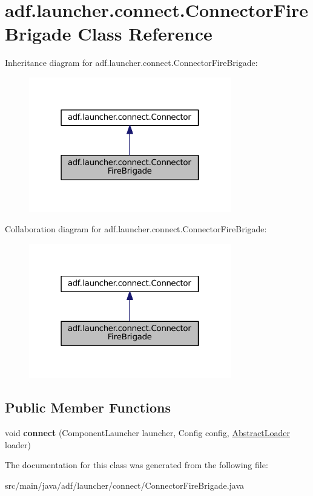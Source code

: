 \hypertarget{classadf_1_1launcher_1_1connect_1_1ConnectorFireBrigade}{}\section{adf.\+launcher.\+connect.\+Connector\+Fire\+Brigade Class Reference}
\label{classadf_1_1launcher_1_1connect_1_1ConnectorFireBrigade}


Inheritance diagram for adf.\+launcher.\+connect.\+Connector\+Fire\+Brigade\+:
\nopagebreak
\begin{figure}[H]
\begin{center}
\leavevmode
\includegraphics[width=250pt]{classadf_1_1launcher_1_1connect_1_1ConnectorFireBrigade__inherit__graph}
\end{center}
\end{figure}


Collaboration diagram for adf.\+launcher.\+connect.\+Connector\+Fire\+Brigade\+:
\nopagebreak
\begin{figure}[H]
\begin{center}
\leavevmode
\includegraphics[width=250pt]{classadf_1_1launcher_1_1connect_1_1ConnectorFireBrigade__coll__graph}
\end{center}
\end{figure}
\subsection*{Public Member Functions}
\begin{DoxyCompactItemize}
\item 
\hypertarget{classadf_1_1launcher_1_1connect_1_1ConnectorFireBrigade_ae430ca086d1713107280806dd69656cb}{}\label{classadf_1_1launcher_1_1connect_1_1ConnectorFireBrigade_ae430ca086d1713107280806dd69656cb} 
void {\bfseries connect} (Component\+Launcher launcher, Config config, \hyperlink{classadf_1_1component_1_1AbstractLoader}{Abstract\+Loader} loader)
\end{DoxyCompactItemize}


The documentation for this class was generated from the following file\+:\begin{DoxyCompactItemize}
\item 
src/main/java/adf/launcher/connect/Connector\+Fire\+Brigade.\+java\end{DoxyCompactItemize}
